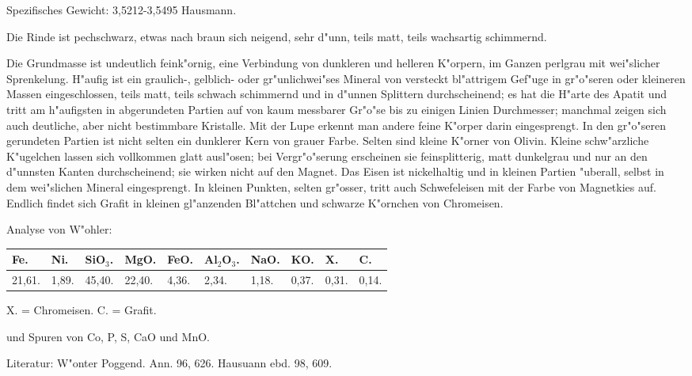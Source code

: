 \documentclass[a4paper, 11pt, oneside]{article}
\begin{document}
Spezifisches Gewicht: 3,5212-3,5495 Hausmann.

Die Rinde ist pechschwarz, etwas nach braun sich neigend, sehr d"unn, teils matt, teils wachsartig schimmernd.

Die Grundmasse ist undeutlich feink"ornig, eine Verbindung von dunkleren und helleren K"orpern, im Ganzen perlgrau mit wei"slicher Sprenkelung. H"aufig ist ein graulich-, gelblich- oder gr"unlichwei"ses Mineral von versteckt bl"attrigem Gef"uge in gr"o"seren oder kleineren Massen eingeschlossen, teils matt, teils schwach schimmernd und in d"unnen Splittern durchscheinend; es hat die H"arte des Apatit und tritt am h"aufigsten in abgerundeten Partien auf von kaum messbarer Gr"o"se bis zu einigen Linien Durchmesser; manchmal zeigen sich auch deutliche, aber nicht bestimmbare Kristalle. Mit der Lupe erkennt man andere feine K"orper darin eingesprengt. In den gr"o"seren gerundeten Partien ist nicht selten ein dunklerer Kern von grauer Farbe. Selten sind kleine K"orner von Olivin. Kleine schw"arzliche K"ugelchen lassen sich vollkommen glatt ausl"osen; bei Vergr"o"serung erscheinen sie feinsplitterig, matt dunkelgrau und nur an den d"unnsten Kanten durchscheinend; sie wirken nicht auf den Magnet. Das Eisen ist nickelhaltig und in kleinen Partien "uberall, selbst in dem wei"slichen Mineral eingesprengt. In kleinen Punkten, selten gr"osser, tritt auch Schwefeleisen mit der Farbe von Magnetkies auf. Endlich findet sich Grafit in kleinen gl"anzenden Bl"attchen und schwarze K"ornchen von Chromeisen.

Analyse von W"ohler:
\begin{table}[!ht]
    \centering\swabfamily\Large
    \normalsize
    \begin{tabular}{l l l l l l l l l l}
        Fe. & Ni. & SiO$_{3}$. & MgO. & FeO. & Al$_{2}$O$_{3}$. & NaO. & KO. & X. & C. \\ \hline
        21,61. & 1,89. & 45,40. & 22,40. & 4,36. & 2,34. & 1,18. & 0,37. & 0,31. & 0,14. \\
    \end{tabular}
\end{table}

X. = Chromeisen. C. = Grafit.

und Spuren von Co, P, S, CaO und MnO.

\normalsize
Literatur: W"onter Poggend. Ann. 96, 626. Hausuann ebd. 98, 609.

\subsection{}
\LARGE
\end{document}
